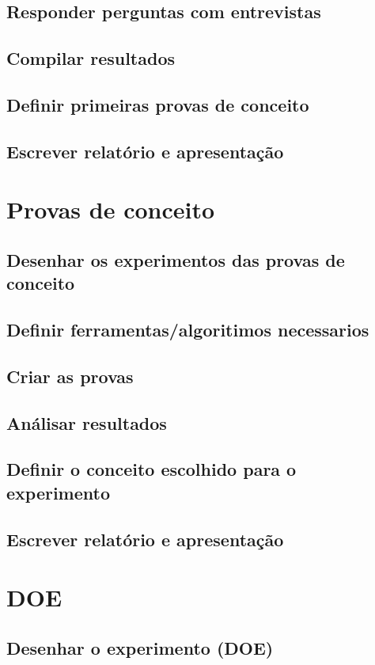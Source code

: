 \documentclass{article}
\begin{document}
\subsection{Responder perguntas com entrevistas}
\subsection{Compilar resultados}
\subsection{Definir primeiras provas de conceito}
\subsection{Escrever relatório e apresentação}
\section{Provas de conceito}
\subsection{Desenhar os experimentos das provas de conceito}
\subsection{Definir ferramentas/algoritimos necessarios}
\subsection{Criar as provas}
\subsection{Análisar resultados}
\subsection{Definir o conceito escolhido para o experimento}
\subsection{Escrever relatório e apresentação}
\section{DOE}
\subsection{Desenhar o experimento (DOE)}
\end{document}
